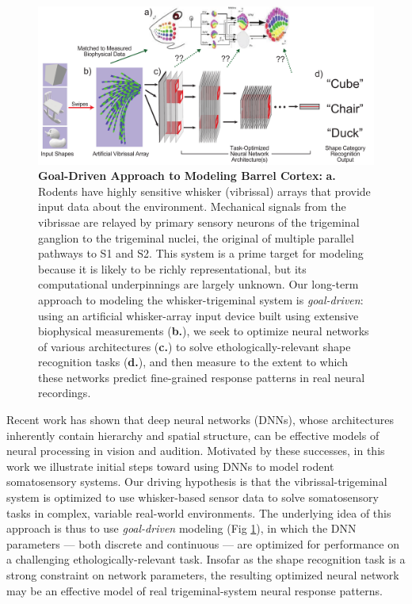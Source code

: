 \begin{figure}
\centering
\includegraphics[width=.85\linewidth]{figures/schematic.pdf}
\vspace{-3mm}
\caption{\footnotesize{\textbf{Goal-Driven Approach to Modeling Barrel Cortex:} \textbf{a.} Rodents have highly sensitive whisker (vibrissal) arrays that provide input data about the environment. Mechanical signals from the vibrissae are relayed by primary sensory neurons of the trigeminal ganglion to the trigeminal nuclei, the original of multiple parallel pathways to S1 and S2.  This system is a prime target for modeling because it is likely to be richly representational, but its computational underpinnings are largely unknown. Our long-term approach to modeling the whisker-trigeminal system is \emph{goal-driven}: using an artificial whisker-array input device built using extensive biophysical measurements (\textbf{b.}), we seek to optimize neural networks of various architectures (\textbf{c.}) to solve ethologically-relevant shape recognition tasks (\textbf{d.}), and then measure to the extent to which these networks predict fine-grained response patterns in real neural recordings.} ~\label{fig_schematic}}
\vspace{-5mm}
\end{figure}

Recent work has shown that deep neural networks (DNNs), whose architectures inherently contain hierarchy and spatial structure, can be effective models of neural processing in vision\cite{Yamins2014,khaligh2014deep} and audition\cite{kell_yamins_sfn}.
Motivated by these successes, in this work we illustrate initial steps toward using DNNs to model rodent somatosensory systems.
Our driving hypothesis is that the vibrissal-trigeminal system is optimized to use whisker-based sensor data to solve somatosensory tasks in complex, variable real-world environments.
The underlying idea of this approach is thus to use \emph{goal-driven} modeling (Fig \ref{fig_schematic}), in which the DNN parameters --- both discrete and continuous --- are optimized for performance on a challenging ethologically-relevant task\cite{yamins2016using}.
Insofar as the shape recognition task is a strong constraint on network parameters, the resulting optimized neural network may be an effective model of real trigeminal-system neural response patterns.

